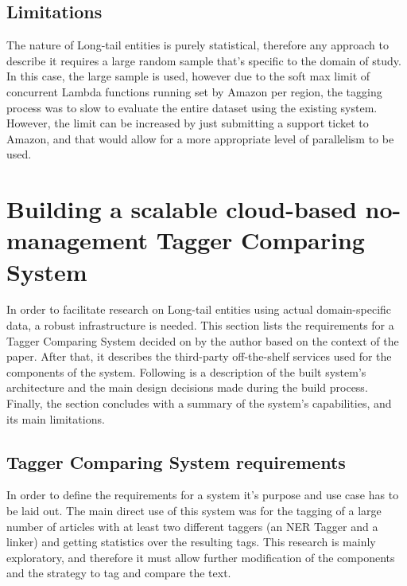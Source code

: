 \subsection{Limitations}
The nature of Long-tail entities is purely statistical, therefore any approach to describe it requires a large random sample that's specific to the
domain of study.
In this case, the large sample is used, however due to the soft max limit of concurrent Lambda functions running set by Amazon per region, the tagging process
was to slow to evaluate the entire dataset using the existing system. 
However, the limit can be increased by just submitting a support ticket to Amazon, and that would allow for a more appropriate level of parallelism to be used.

\section{Building a scalable cloud-based no-management Tagger Comparing System} \label{TaggerSystem}
In order to facilitate research on Long-tail entities using actual domain-specific data, a robust infrastructure is needed.
This section lists the requirements for a Tagger Comparing System decided on by the author based on the context of the paper.
After that, it describes the third-party off-the-shelf services used for the components of the system.
Following is a description of the built system's architecture and the main design decisions made during the build process.
Finally, the section concludes with a summary of the system's capabilities, and its main limitations. 

\subsection{Tagger Comparing System requirements}
In order to define the requirements for a system it's purpose and use case has to be laid out.
The main direct use of this system was for the tagging of a large number of articles with at least two different taggers (an NER Tagger and a linker) and getting statistics over the resulting tags.
This research is mainly exploratory, and therefore it must allow further modification of the components and the strategy to tag and compare the text.

